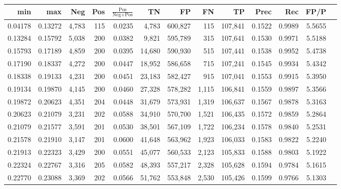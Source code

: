 \begin{tabular}{rrrrrrrrrrrrr}
\toprule
    min &     max &   Neg & Pos & $\frac{\text{Pos}}{\text{Neg}+\text{Pos}}$ &      TN &      FP &      FN &      TP &   Prec &    Rec &   FP/P \\
\midrule
0.04178 & 0.13272 & 4,783 & 115 &                                     0.0235 &   4,783 & 600,827 &     115 & 107,841 & 0.1522 & 0.9989 & 5.5655 \\
0.13284 & 0.15792 & 5,038 & 200 &                                     0.0382 &   9,821 & 595,789 &     315 & 107,641 & 0.1530 & 0.9971 & 5.5188 \\
0.15793 & 0.17189 & 4,859 & 200 &                                     0.0395 &  14,680 & 590,930 &     515 & 107,441 & 0.1538 & 0.9952 & 5.4738 \\
0.17190 & 0.18337 & 4,272 & 200 &                                     0.0447 &  18,952 & 586,658 &     715 & 107,241 & 0.1545 & 0.9934 & 5.4342 \\
0.18338 & 0.19133 & 4,231 & 200 &                                     0.0451 &  23,183 & 582,427 &     915 & 107,041 & 0.1553 & 0.9915 & 5.3950 \\
0.19134 & 0.19870 & 4,145 & 200 &                                     0.0460 &  27,328 & 578,282 &   1,115 & 106,841 & 0.1559 & 0.9897 & 5.3566 \\
0.19872 & 0.20623 & 4,351 & 204 &                                     0.0448 &  31,679 & 573,931 &   1,319 & 106,637 & 0.1567 & 0.9878 & 5.3163 \\
0.20623 & 0.21079 & 3,231 & 202 &                                     0.0588 &  34,910 & 570,700 &   1,521 & 106,435 & 0.1572 & 0.9859 & 5.2864 \\
0.21079 & 0.21577 & 3,591 & 201 &                                     0.0530 &  38,501 & 567,109 &   1,722 & 106,234 & 0.1578 & 0.9840 & 5.2531 \\
0.21578 & 0.21910 & 3,147 & 201 &                                     0.0600 &  41,648 & 563,962 &   1,923 & 106,033 & 0.1583 & 0.9822 & 5.2240 \\
0.21913 & 0.22323 & 3,429 & 200 &                                     0.0551 &  45,077 & 560,533 &   2,123 & 105,833 & 0.1588 & 0.9803 & 5.1922 \\
0.22324 & 0.22767 & 3,316 & 205 &                                     0.0582 &  48,393 & 557,217 &   2,328 & 105,628 & 0.1594 & 0.9784 & 5.1615 \\
0.22770 & 0.23088 & 3,369 & 202 &                                     0.0566 &  51,762 & 553,848 &   2,530 & 105,426 & 0.1599 & 0.9766 & 5.1303 \\

\end{tabular}
